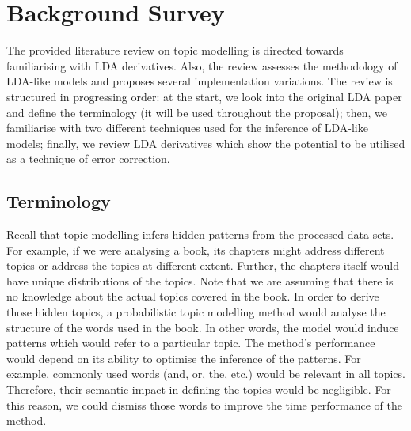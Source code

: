 \documentclass{mprop}
\begin{document}
\section{Background Survey}

\par The provided literature review on topic modelling is directed towards familiarising with LDA derivatives. Also, the review assesses the methodology of LDA-like models and proposes several implementation variations. The review is structured in progressing order: at the start, we look into the original LDA paper and define the terminology (it will be used throughout the proposal); then, we familiarise with two different techniques used for the inference of LDA-like models; finally, we review LDA derivatives which show the potential to be utilised as a technique of error correction.

\subsection{Terminology}

\par Recall that topic modelling infers hidden patterns from the processed data sets. For example, if we were analysing a book, its chapters might address different topics or address the topics at different extent. Further, the chapters itself would have unique distributions of the topics. Note that we are assuming that there is no knowledge about the actual topics covered in the book. In order to derive those hidden topics, a probabilistic topic modelling method would analyse the structure of the words used in the book. In other words, the model would induce patterns which would refer to a particular topic. The method's performance would depend on its ability to optimise the inference of the patterns. For example, commonly used words (and, or, the, etc.) would be relevant in all topics. Therefore, their semantic impact in defining the topics would be negligible. For this reason, we could dismiss those words to improve the time performance of the method. 
\end{document}
